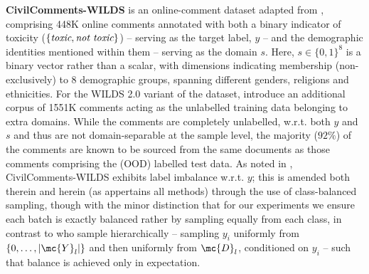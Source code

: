 \textbf{CivilComments-WILDS} is an online-comment dataset adapted from
\cite{borkan2019nuanced},  comprising 448K online comments
annotated with both a binary indicator of toxicity ($\{\mathrm{\emph{toxic}, \emph{not toxic}}\}$)
-- serving as the target label, $y$ -- and the demographic identities mentioned within them --
serving as the
domain $s$. 
Here, $s \in \{0, 1\}^8$ is a binary vector rather than a scalar, with dimensions 
indicating membership (non-exclusively) to 8 demographic groups, spanning different genders,
religions and ethnicities.
For the WILDS 2.0 variant of the dataset, \cite{SagWeiLeeGaoetal22} introduce an additional corpus
of 1551K
comments acting as the unlabelled training data belonging to extra domains.
While the comments are completely unlabelled, w.r.t. both $y$ and $s$ and thus are not
domain-separable at the sample level, the majority ($92\%$) of the comments are known to be sourced
from the same documents as those comments comprising the (OOD) labelled test data. 
As noted in \cite{SagWeiLeeGaoetal22}, CivilComments-WILDS exhibits label imbalance w.r.t. $y$;
this is amended both therein and herein (as appertains all methods) through the use of
class-balanced sampling, though with the minor distinction that for our experiments we ensure each
batch is exactly balanced rather by sampling equally from each class, in contrast to
\cite{SagWeiLeeGaoetal22} who sample hierarchically -- sampling $y_i$ uniformly from $\{0, \dots,
|\mc{Y}_l|\}$ and then uniformly from $\mc{D}_l$, conditioned on $y_i$ -- such that balance is
achieved only in expectation.
